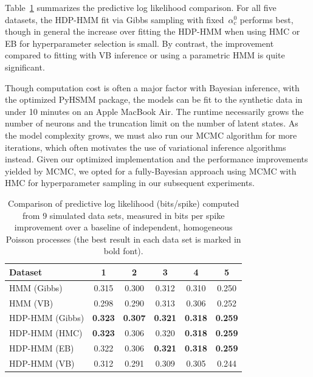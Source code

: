 Table~\ref{tab:synth_pll} summarizes the predictive log likelihood
comparison.  For all five datasets, the HDP-HMM fit via Gibbs sampling
with fixed~$\alpha_c^0$ performs best, though in general the
increase over fitting the HDP-HMM when using HMC or EB for
hyperparameter selection is small. By contrast, the improvement compared 
to fitting with VB  inference or using a parametric HMM is 
quite significant.

Though computation cost is often a major factor with Bayesian
inference, with the optimized PyHSMM package, the models can be fit to
the synthetic data in under 10 minutes on an Apple MacBook Air. The
runtime necessarily grows the number of neurons and the truncation
limit on the number of latent states. As the model complexity grows,
we must also run our MCMC algorithm for more iterations, which often
motivates the use of variational inference algorithms instead. Given
our optimized implementation and the performance improvements yielded
by MCMC, we opted for a fully-Bayesian approach using MCMC with HMC
for hyperparameter sampling in our subsequent experiments.

\begin{table}
\centering
\caption{Comparison of predictive log likelihood (bits/spike)  computed from 9 simulated data sets, measured in bits per spike improvement over a baseline of independent, homogeneous Poisson processes (the best result in each data set is marked in bold font). }
\begin{tabular}{l|ccccc}
Dataset & 1 & 2 & 3 & 4 & 5 \\
\hline
HMM (Gibbs) & 0.315 & 0.300 & 0.312 & 0.310 & 0.250 \\
HMM (VB)  & 0.298 & 0.290 & 0.313 & 0.306 & 0.252 \\ 
HDP-HMM (Gibbs) & \bf{0.323} & \bf{0.307} & \bf{0.321} & \bf{0.318} & \bf{0.259} \\
HDP-HMM (HMC) & \bf{0.323} & 0.306 & 0.320 & \bf{0.318} & \bf{0.259} \\
HDP-HMM (EB)  & 0.322 & 0.306 & \bf{0.321} & \bf{0.318} & \bf{0.259} \\
HDP-HMM (VB)  & 0.312 & 0.291 & 0.309 & 0.305 & 0.244 \\
\hline
\end{tabular}
\label{tab:synth_pll}
\end{table}

